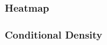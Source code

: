 \documentclass{beamer}
\begin{document}
\begin{frame}
\frametitle{Heatmap}
\begin{center}
\end{center}
\end{frame}

\begin{frame}
\frametitle{Conditional Density}
\begin{center}
\end{center}
\end{frame}
\end{document}
